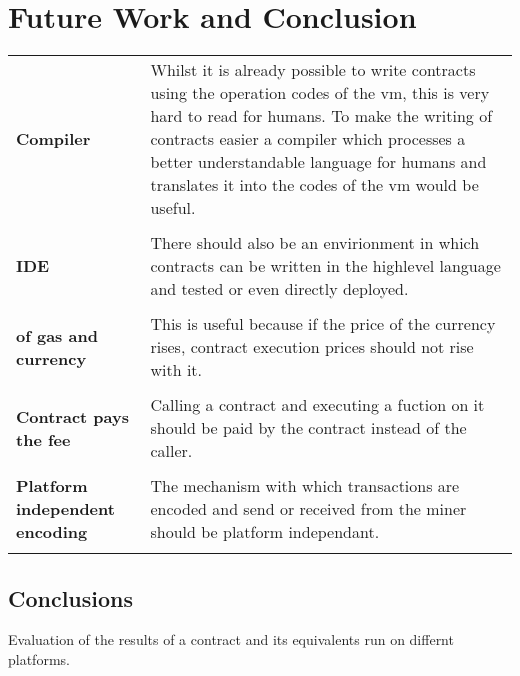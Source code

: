 \chapter{Future Work and Conclusion}
\label{futureworkandconclusions}
\begin{tabular}[t]{ p{3cm} p{12.5cm}}
\raggedright
\textbf{Compiler} & 
Whilst it is already possible to write contracts using the operation codes of the vm, this is very hard to read for humans. To make the writing of contracts easier a compiler which processes a better understandable language for humans and translates it into the codes of the vm would be useful. \\ \\

\textbf{IDE} & 
There should also be an envirionment in which contracts can be written in the highlevel language and tested or even directly deployed. \\ \\

\raggedright
\textbf{of gas and currency} & 
This is useful because if the price of the currency rises, contract execution prices should not rise with it. \\ \\

\raggedright
\textbf{Contract pays the fee} & 
Calling a contract and executing a fuction on it should be paid by the contract instead of the caller. \\ \\

\raggedright
\textbf{Platform independent encoding} &
The mechanism with which transactions are encoded and send or received from the miner should be platform independant.\\ \\ 
\end{tabular}
\section{Conclusions}
Evaluation of the results of a contract and its equivalents run on differnt platforms.